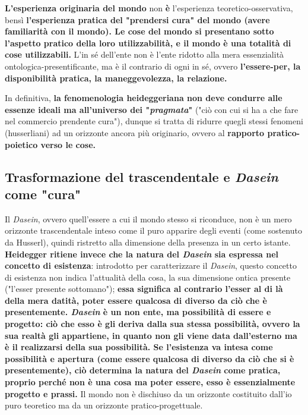 \textbf{L'esperienza originaria del mondo} non \textbf{è} l'esperienza
teoretico-osservativa, bensì \textbf{l'esperienza pratica del
"prendersi cura" del mondo (avere familiarità con il mondo).
Le cose del mondo si presentano sotto l'aspetto
pratico della loro utilizzabilità, e il mondo è
una totalità di cose utilizzabili.}
L'in sé dell'ente non è l'ente ridotto alla mera
essenzialità ontologica-presentificante, ma è il
contrario di ogni in sé, ovvero \textbf{l'essere-per, la
disponibilità pratica, la maneggevolezza, la relazione.}

In definitiva,\textbf{ la fenomenologia heideggeriana non deve
condurre alle essenze ideali ma all'universo dei
"\textit{pragmata}"} ("ciò con cui si ha a che fare nel commercio
prendente cura"), dunque si tratta di ridurre
quegli stessi fenomeni (husserliani) ad un
orizzonte ancora più originario, ovvero al
\textbf{rapporto pratico-poietico verso le cose.}

\subsection{Trasformazione del trascendentale e \textit{Dasein} come "cura"}

Il \textit{Dasein}, ovvero quell'essere a cui il mondo stesso si
riconduce, non è un mero orizzonte trascendentale
inteso come il puro apparire degli eventi (come sostenuto da
Husserl), quindi ristretto alla dimensione
della presenza in un certo istante.
\textbf{Heidegger ritiene invece che la natura del \textit{Dasein} sia
espressa nel concetto di esistenza}: introdotto per caratterizzare il \textit{Dasein}, questo concetto
di esistenza non
indica l'attualità della cosa, la sua dimensione ontica
presente ("l'esser presente sottomano"); \textbf{essa significa
al contrario l'esser al di là della mera datità, poter
essere qualcosa di diverso da ciò che è presentemente.
\textit{Dasein} è un non ente, ma possibilità di essere e
progetto: ciò che esso è gli deriva dalla sua stessa
possibilità, ovvero la sua realtà gli appartiene,
in quanto non gli viene data dall'esterno ma è
il realizzarsi della sua possibilità.
Se l'esistenza va intesa come possibilità e apertura (come essere qualcosa di diverso da ciò che si è presentemente),
ciò determina la natura del \textit{Dasein} come pratica,
proprio perché non è una cosa ma poter essere,
esso è essenzialmente progetto e prassi.}
Il mondo non è dischiuso da un orizzonte costituito
dall'io puro teoretico ma da un orizzonte pratico-progettuale.

